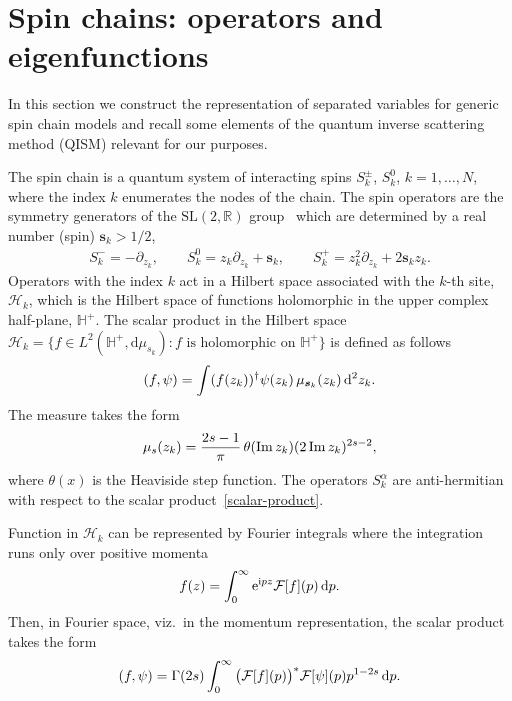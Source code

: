 \section{Spin chains: operators and eigenfunctions}\label{sect:spinchains}

In this section we construct the representation of separated variables for generic spin chain models and recall some elements of
the quantum inverse scattering method (QISM) relevant for our purposes.

The spin chain is a quantum system of interacting spins $S_k^\pm$, $S^0_k$, $k=1,\dots, N$, where the index $k$ enumerates the nodes of the
chain. The spin operators are the symmetry generators of the $\mathrm{SL}(2,\mathbb R)$ group~\cite{MR0207913} which are determined by a
real number (spin) $\boldsymbol s_k>1/2$,
\begin{gather*}
S_k^-=-\partial_{z_k},\qquad
S_k^0=z_k\partial_{z_k}+\boldsymbol s_k,\qquad
S_k^+=z^2_k\partial_{z_k}+2\boldsymbol s_k z_k.
\end{gather*}
Operators with the index $k$ act in a Hilbert space associated with the $k$-th site, $\mathcal H_k$, which is the Hilbert space of
functions holomorphic in the upper complex half-plane, $\mathbb H^+$. The scalar product in the Hilbert space $\mathcal H_k=\big\{ f \in
L^2(\mathbb H^+,\mathrm{d}\mu_{s_k})\colon f \text{ is holomorphic on } \mathbb H^+ \big\}$ is defined as follows
\begin{gather}\label{scalar-product}
(f,\psi)=\int(f(z_k))^\dagger \psi(z_k)\, \mu_{\boldsymbol s_k}(z_k)\,{\rm d}^2z_k.
\end{gather}
The measure takes the form
\begin{gather}
\mu_{s}(z_k)=\frac{2s-1}{\pi}\,\theta(\mathop{\rm Im}z_k)
(2\mathop{\rm Im} z_k)^{2 s-2},
\label{def-measure}
\end{gather}
where $\theta(x)$ is the Heaviside step function.
 The operators $S_k^\alpha$ are anti-hermitian with respect to the scalar product~\eqref{scalar-product}.

Function in $\mathcal H_k$ can be represented by Fourier integrals where the integration runs only over positive momenta
\begin{gather*}
f(z)=\int_0^\infty {\rm e}^{{\rm i}p z} \mathcal{F}[f](p)\, {\rm d}p.
\end{gather*}
Then, in Fourier space, viz.~in the momentum representation, the scalar product takes the form
\begin{gather*}
(f,\psi) =\Gamma(2s) \int_0^\infty \big( \mathcal{F}[f](p) \big)^* \mathcal{F}[\psi](p) p^{1-2s} \, {\rm d}p.
\end{gather*}

